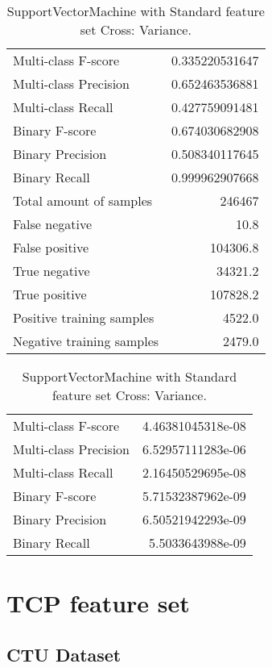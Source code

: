 \begin{table}[H]
\begin{minipage}{0.5\textwidth}
\caption{SupportVectorMachine with Standard feature set Cross: Average.}
\centering
\begin{tabular}{l r}
\toprule
Multi-class F-score & 0.335220531647 \\
Multi-class Precision & 0.652463536881 \\
Multi-class Recall & 0.427759091481 \\
\midrule
Binary F-score & 0.674030682908 \\
Binary Precision & 0.508340117645 \\
Binary Recall & 0.999962907668 \\
\midrule
Total amount of samples & 246467 \\
False negative & 10.8 \\
False positive & 104306.8 \\
True negative & 34321.2 \\
True positive & 107828.2 \\
\midrule
Positive training samples & 4522.0 \\
Negative training samples & 2479.0 \\
\bottomrule
\end{tabular}
\end{minipage}
\hfillx
\begin{minipage}{0.5\textwidth}
\caption{SupportVectorMachine with Standard feature set Cross: Variance.}
\centering
\begin{tabular}{l r}
\toprule
Multi-class F-score & 4.46381045318e-08 \\
Multi-class Precision & 6.52957111283e-06 \\
Multi-class Recall & 2.16450529695e-08 \\
\midrule
Binary F-score & 5.71532387962e-09 \\
Binary Precision & 6.50521942293e-09 \\
Binary Recall & 5.5033643988e-09 \\
\bottomrule
\end{tabular}
\end{minipage}
\end{table}

\newpage
\section{TCP feature set}
\subsection{CTU Dataset}

